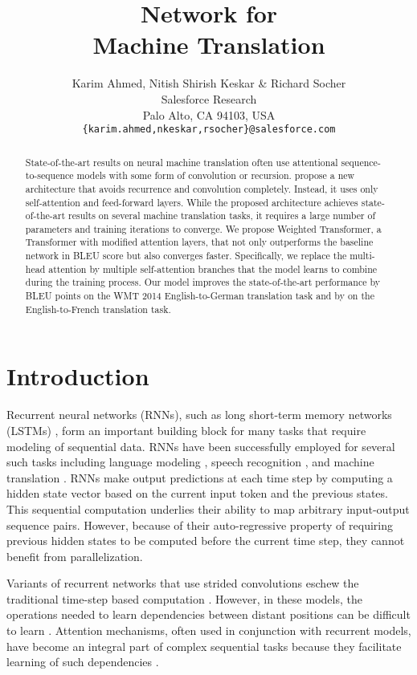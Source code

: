 \documentclass{article} \usepackage{iclr2018_conference,times}
\title{\name Network for \\ Machine Translation}
\author{Karim Ahmed, Nitish Shirish Keskar \& Richard Socher \\
Salesforce Research \\
Palo Alto, CA 94103, USA\\
\texttt{\{karim.ahmed,nkeskar,rsocher\}@salesforce.com} \\
}
\newcommand{\name}{Weighted Transformer\xspace}
\begin{document}
\maketitle

\begin{abstract}
State-of-the-art results on neural machine translation often use attentional sequence-to-sequence models with some form of convolution or recursion. \citet{vaswani2017attention} propose a new architecture that avoids recurrence and convolution completely. Instead, it uses only self-attention and feed-forward layers. While the proposed architecture achieves state-of-the-art results on several machine translation tasks, it requires a large number of parameters and training iterations to converge. We propose \name, a Transformer with modified attention layers, that not only outperforms the baseline network in BLEU score but also converges  faster. 
Specifically, we replace the multi-head attention by multiple self-attention branches that the model learns to combine during the training process. 
Our model improves the state-of-the-art performance by  BLEU points on the WMT 2014 English-to-German translation task and by  on the English-to-French translation task. \end{abstract}

\section{Introduction}
Recurrent neural networks (RNNs), such as long short-term memory networks (LSTMs) \citep{hochreiter1997long}, form an important building block for many tasks that require modeling of sequential data. RNNs have been successfully employed for several such tasks including language modeling \citep{melis2017state,merity2017regularizing}, speech recognition \citep{xiong2017microsoft,graves2013speech}, and machine translation \citep{wu2016google,bahdanau2014neural}. RNNs make output predictions at each time step by computing a hidden state vector  based on the current input token and the previous states. This sequential computation underlies their ability to map arbitrary input-output sequence pairs. However, because of their auto-regressive property of requiring previous hidden states to be computed before the current time step, they cannot benefit from parallelization.

Variants of recurrent networks that use strided convolutions eschew the traditional time-step based computation \citep{kaiser2016can,lei2017training,bradbury2016quasi,gehring2016convenc,gehring2017convs2s,kalchbrenner2016neural}.  However, in these models, the operations needed to learn dependencies between distant positions can be difficult to learn \citep{hochreiter2001gradient,hochreiter1998vanishing}. Attention mechanisms, often used in conjunction with recurrent models, have become an integral part of complex sequential tasks because they facilitate learning of such dependencies \citep{luong2015effective,bahdanau2014neural,parikh2016decomposable,paulus2017deep,kim2017structured}.
\end{document}
